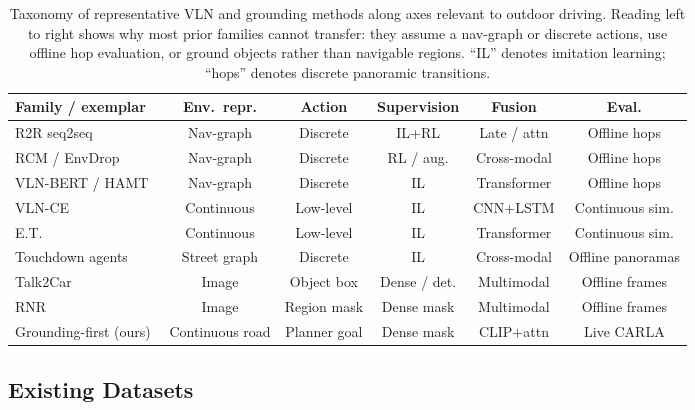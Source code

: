 \begin{table}[ht]
\centering
\scriptsize
\begin{tabular}{@{}lccccc@{}}
\toprule
Family / exemplar & Env.\ repr. & Action & Supervision & Fusion & Eval. \\
\midrule
R2R seq2seq~\cite{anderson2018vision} & Nav-graph & Discrete & IL+RL & Late / attn & Offline hops \\
RCM / EnvDrop~\cite{Wang_Huang_Celikyilmaz_Gao_Shen_Wang_Wang_Zhang_2019,tan2019learning} & Nav-graph & Discrete & RL / aug. & Cross-modal & Offline hops \\
VLN-BERT / HAMT~\cite{hong2021vln,chen2021hamt} & Nav-graph & Discrete & IL & Transformer & Offline hops \\
VLN-CE~\cite{krantz2020beyond} & Continuous & Low-level & IL & CNN+LSTM & Continuous sim. \\
E.T.~\cite{pashevich2021episodic} & Continuous & Low-level & IL & Transformer & Continuous sim. \\
Touchdown agents~\cite{Chen2019TOUCHDOWN,schumann-riezler-2022-analyzing} & Street graph & Discrete & IL & Cross-modal & Offline panoramas \\
Talk2Car~\cite{deruyttere2019talk2car} & Image & Object box & Dense / det. & Multimodal & Offline frames \\
RNR~\cite{Rufus_2021} & Image & Region mask & Dense mask & Multimodal & Offline frames \\
Grounding-first (ours) & Continuous road & Planner goal & Dense mask & CLIP+attn & Live CARLA \\
\bottomrule
\end{tabular}
\caption[Taxonomy of VLN methods for outdoor driving]{Taxonomy of representative VLN and grounding methods along axes relevant to outdoor driving. Reading left to right shows why most prior families cannot transfer: they assume a nav-graph or discrete actions, use offline hop evaluation, or ground objects rather than navigable regions. ``IL'' denotes imitation learning; ``hops'' denotes discrete panoramic transitions.}
\label{table:method_taxonomy}
\end{table}

\subsection{Existing Datasets}

